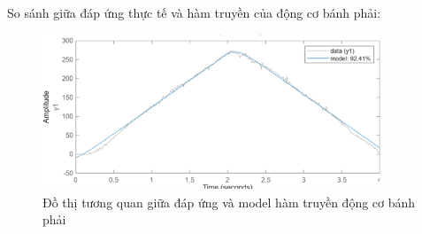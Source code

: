               So sánh giữa đáp ứng thực tế và hàm truyền của động cơ bánh phải:
               \begin{figure}[H]
                    \centering
                    \includegraphics[width=0.9\textwidth]{pictures/chapter5/CJGB1_compare.png}
                    \caption{Đồ thị tương quan giữa đáp ứng và model hàm truyền động cơ bánh phải}
                    \label{CJGB1_compare}
               \end{figure} 
